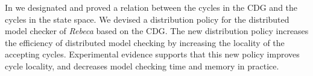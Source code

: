 In \cite{DBLP:journals/eceasst/KhamespanahSMSR15} we designated and proved a relation between the cycles in the CDG and the cycles in the state space. We devised a distribution policy for the distributed model checker of \emph{Rebeca} based on the CDG. The new distribution policy increases the efficiency of distributed model checking by increasing the locality of the accepting cycles.
Experimental evidence supports that this new policy improves cycle locality, and decreases model checking time and memory in practice.